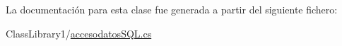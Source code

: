 La documentación para esta clase fue generada a partir del siguiente fichero\+:\begin{DoxyCompactItemize}
\item 
Class\+Library1/\mbox{\hyperlink{_class_library1_2accesodatos_s_q_l_8cs}{accesodatos\+S\+Q\+L.\+cs}}\end{DoxyCompactItemize}

